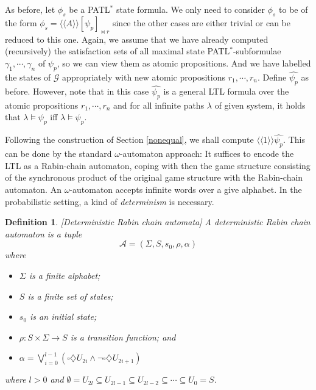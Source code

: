 \documentclass[times, 10 pt,twocolumn]{article}
\newtheorem{definition}[theorem]{Definition}{\bfseries}{\rm}
\newcommand{\mc}[1]{\mathcal{#1}}
\newcommand{\lla}{\langle\langle}
\newcommand{\rra}{\rangle\rangle}
\begin{document}
As before, let $\phi_s$ be a PATL$^*$ state formula. We only need
to consider $\phi_s$ to be of the form $\phi_s=\lla A\rra
[\psi_p]_{\bowtie r}$ since the other cases are either trivial or
can be reduced to this one.
%
%
Again, we assume that we have already computed (recursively) the
satisfaction sets of all maximal state PATL$^*$-subformulae
$\gamma_1, \cdots, \gamma_n$ of $\psi_p$, so we can view them as
atomic propositions. And we have labelled the states of $\mc{G}$
appropriately with new atomic propositions $r_1, \cdots, r_n$.
%
Define $\widehat{\psi_p}$ as before. However, note that in this
case $\widehat{\psi_p}$ is a general LTL formula over the atomic
propositions $r_1, \cdots, r_n$ and for all infinite paths
$\lambda$ of given system, it holds that $\lambda\models \psi_p$
iff $\lambda\models \widehat{\psi_p}$.

Following the construction of Section \ref{nonequal}, we shall
compute $\lla 1\rra \widehat{\psi_p}$. This can be done by the
standard $\omega$-automaton approach: It suffices to encode the
LTL as a Rabin-chain automaton, coping with then the game
structure consisting of the synchronous product of the original
game structure with the Rabin-chain automaton. An
$\omega$-automaton accepts infinite words over a give alphabet. In
the probabilistic setting, a kind of \emph{determinism} is
necessary. %

\begin{definition} \label{rbc} [Deterministic Rabin chain automata]
A deterministic Rabin chain automaton is a tuple
\[\mc{A}=(\Sigma, S, s_0, \rho, \alpha)\]
where
\begin{itemize}
  \item $\Sigma$ is a finite alphabet;

  \item $S$ is a finite set of states;

  \item $s_0$ is an initial state;

  \item $\rho:S\times\Sigma\rightarrow S$ is a transition
  function; and

  \item $\alpha=\bigvee_{i=0}^{l-1}(\square\diamondsuit U_{2i}\wedge \neg\square\diamondsuit U_{2i+1})$ %
\end{itemize}
where $l>0$ and $\emptyset=U_{2l}\subseteq U_{2l-1}\subseteq
U_{2l-2}\subseteq\cdots\subseteq U_0=S$.
\end{definition}
\end{document}
